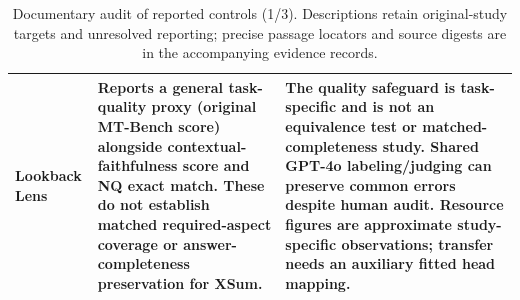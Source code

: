 \begin{table}[tp]
\begin{tabularx}{\textwidth}{@{}>{\raggedright\arraybackslash}p{}>{\raggedright\arraybackslash}p{}>{\raggedright\arraybackslash}X@{}}
Lookback Lens \citep{chuang-etal-2024-lookback} & Reports a general task-quality proxy (original MT-Bench score) alongside contextual-faithfulness score and NQ exact match. These do not establish matched required-aspect coverage or answer-completeness preservation for XSum. & The quality safeguard is task-specific and is not an equivalence test or matched-completeness study. Shared GPT-4o labeling/judging can preserve common errors despite human audit. Resource figures are approximate study-specific observations; transfer needs an auxiliary fitted head mapping. \\
\bottomrule\end{tabularx}
\caption{Documentary audit of reported controls (1/3). Descriptions retain original-study targets and unresolved reporting; precise passage locators and source digests are in the accompanying evidence records.}
\label{tab:audit-1}\end{table}

